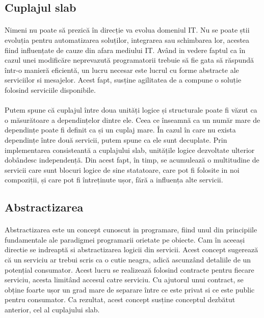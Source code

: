 \documentclass[12pt]{report}
\begin{document}
  	\subsection{Cuplajul slab}
  	\paragraph{}Nimeni nu poate să prezică în direcție va evolua domeniul IT. Nu se poate știi evoluția pentru automatizarea soluților, integrarea sau schimbarea lor, acestea fiind influențate de cauze din afara mediului IT. Având in vedere faptul ca în cazul unei modificăre neprevazută programatorii trebuie să fie gata să răspundă într-o manieră eficientă, un lucru necesar este lucrul cu forme abstracte ale serviciilor si mesajelor. Acest fapt, susține agilitatea de a compune o soluție folosind serviciile disponibile.
  	\paragraph{}Putem spune că cuplajul între doua unități logice și structurale poate fi văzut ca o măsurătoare a dependințelor dintre ele. Ceea ce înseamnă ca un număr mare de dependințe poate fi definit ca și un cuplaj mare. În cazul în care nu exista dependințe între două servicii, putem spune ca ele sunt decuplate. Prin implementarea consisteantă a cuplajului slab, unitățile logice dezvoltate ulterior dobândesc independență. Din acest fapt, în timp, se acumulează o multitudine de servicii care sunt blocuri logice de sine statatoare, care pot fi folosite in noi compoziții, și care pot fi întreținute ușor, fără a influența alte servicii.
  	\subsection{Abstractizarea}
  	\paragraph{}Abstractizarea este un concept cunoscut in programare, fiind unul din principiile fundamentale ale paradigmei programarii orietate pe obiecte. Cam în aceeași directie se indreaptă si abstractizarea logicii din servicii. Acest concept sugerează că un serviciu ar trebui scris ca o cutie neagra, adică ascunzând detaliile de un potențial consumator. Acest lucru se realizează folosind contracte pentru fiecare serviciu, acesta limitând accesul catre serviciu. Cu ajutorul unui contract, se obține foarte ușor un grad mare de separare între ce este privat si ce este public pentru consumator. Ca rezultat, acest concept susține conceptul dezbătut anterior, cel al cuplajului slab.
\end{document}

